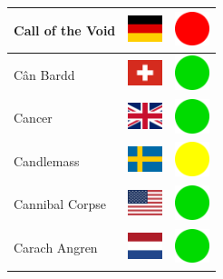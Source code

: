\documentclass[12pt, a4paper, twoside]{report}
\begin{document}
\begin{center}
\begin{longtable}{|p{5cm}|p{2cm}|p{2cm}|}
 Call of the Void                                           & \includegraphics[width=1cm]{../img/flags/de} &   \includegraphics[width=1cm]{../likes/n} \\ \hline
 Cân Bardd                                                  & \includegraphics[width=1cm]{../img/flags/ch} &   \includegraphics[width=1cm]{../likes/y} \\ \hline
 Cancer                                                     & \includegraphics[width=1cm]{../img/flags/gb} &   \includegraphics[width=1cm]{../likes/y} \\ \hline
 Candlemass                                                 & \includegraphics[width=1cm]{../img/flags/se} &   \includegraphics[width=1cm]{../likes/m} \\ \hline
 Cannibal Corpse                                            & \includegraphics[width=1cm]{../img/flags/us} &   \includegraphics[width=1cm]{../likes/y} \\ \hline
 Carach Angren                                              & \includegraphics[width=1cm]{../img/flags/nl} &   \includegraphics[width=1cm]{../likes/y} \\ \hline

\end{longtable}
\end{center}
\end{document}
